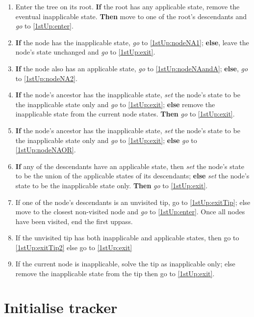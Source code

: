 \documentclass[a4paper,12pt]{article}
\begin{document}
\begin{enumerate}
    \item Enter the tree on its root. \textbf{If} the root has any applicable state, remove the eventual inapplicable state. \textbf{Then} move to one of the root's descendants and \textit{go} to \ref{1stUp:enter}.
    \item \label{1stUp:enter} \textbf{If} the node has the inapplicable state, \textit{go} to \ref{1stUp:nodeNA1}; \textbf{else}, leave the node's state unchanged and \textit{go} to \ref{1stUp:exit}.
    \item \label{1stUp:nodeNA1} \textbf{If} the node also has an applicable state, \textit{go} to \ref{1stUp:nodeNAandA}; \textbf{else}, \textit{go} to \ref{1stUp:nodeNA2}.
    \item \label{1stUp:nodeNAandA} \textbf{If} the node's ancestor has the inapplicable state, \textit{set} the node's state to be the inapplicable state only and \textit{go} to \ref{1stUp:exit}; \textbf{else} remove the inapplicable state from the current node states. \textbf{Then} \textit{go} to \ref{1stUp:exit}.
    \item \label{1stUp:nodeNA2} \textbf{If} the node's ancestor has the inapplicable state, \textit{set} the node's state to be the inapplicable state only and \textit{go} to \ref{1stUp:exit}; \textbf{else} \textit{go} to \ref{1stUp:nodeNAOR}.
    \item \label{1stUp:nodeNAOR} \textbf{If} any of the descendants have an applicable state, then \textit{set} the node's state to be the union of the applicable states of its descendants; \textbf{else} \textit{set} the node's state to be the inapplicable state only. \textbf{Then} \textit{go} to \ref{1stUp:exit}.
    \item \label{1stUp:exit} If one of the node's descendants is an unvisited tip, go to \ref{1stUp:exitTip}; else move to the closest non-visited node and \textit{go} to \ref{1stUp:enter}. Once all nodes have been visited, end the first uppass.
    \item \label{1stUp:exitTip} If the unvisited tip has both inapplicable and applicable states, then go to \ref{1stUp:exitTip2} else go to \ref{1stUp:exit}
    \item \label{1stUp:exitTip2} If the current node is inapplicable, solve the tip as inapplicable only; else remove the inapplicable state from the tip then go to \ref{1stUp:exit}.
\end{enumerate}


\section{Initialise tracker}
\end{document}
